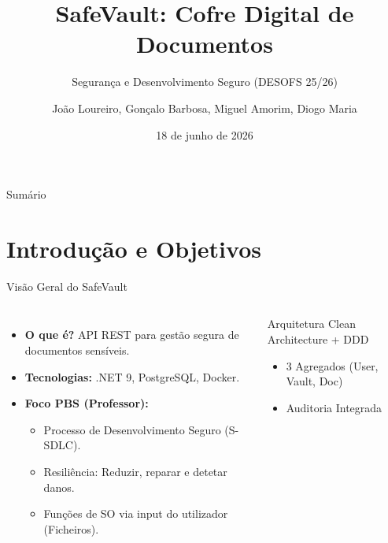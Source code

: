 \documentclass[aspectratio=169]{beamer}
\title[SafeVault]{SafeVault: Cofre Digital de Documentos}
\subtitle{Segurança e Desenvolvimento Seguro (DESOFS 25/26)}
\author[Grupo 3]{João Loureiro, Gonçalo Barbosa, Miguel Amorim, Diogo Maria}
\institute[ISEP]{Instituto Superior de Engenharia do Porto}
\date{18 de junho de 2026}
\begin{document}
\begin{frame}
    \titlepage
\end{frame}

\begin{frame}{Sumário}
    \tableofcontents
\end{frame}

\section{Introdução e Objetivos}
\begin{frame}{Visão Geral do SafeVault}
    \begin{columns}
        \begin{itemize}
            \item \textbf{O que é?} API REST para gestão segura de documentos sensíveis.
            \item \textbf{Tecnologias:} .NET 9, PostgreSQL, Docker.
            \item \textbf{Foco PBS (Professor):}
            \begin{itemize}
                \item Processo de Desenvolvimento Seguro (S-SDLC).
                \item Resiliência: Reduzir, reparar e detetar danos.
                \item Funções de SO via input do utilizador (Ficheiros).
            \end{itemize}
        \end{itemize}
        
        \begin{exampleblock}{Arquitetura}
            Clean Architecture + DDD
            \begin{itemize}
                \item 3 Agregados (User, Vault, Doc)
                \item Auditoria Integrada
            \end{itemize}
        \end{exampleblock}
    \end{columns}
\end{frame}
\end{document}
